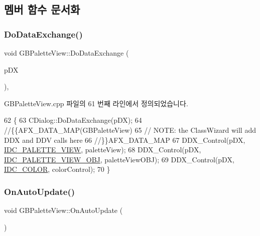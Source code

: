 \subsection{멤버 함수 문서화}
\mbox{\label{class_g_b_palette_view_a44dd90ae3c09c4fb0b2788a4c0577634}} 
\subsubsection{\texorpdfstring{Do\+Data\+Exchange()}{DoDataExchange()}}
{\footnotesize\ttfamily void G\+B\+Palette\+View\+::\+Do\+Data\+Exchange (\begin{DoxyParamCaption}\item[{C\+Data\+Exchange $\ast$}]{p\+DX }\end{DoxyParamCaption})\hspace{0.3cm}{\ttfamily [protected]}, {\ttfamily [virtual]}}



G\+B\+Palette\+View.\+cpp 파일의 61 번째 라인에서 정의되었습니다.


\begin{DoxyCode}
62 \{
63   CDialog::DoDataExchange(pDX);
64   \textcolor{comment}{//\{\{AFX\_DATA\_MAP(GBPaletteView)}
65   \textcolor{comment}{// NOTE: the ClassWizard will add DDX and DDV calls here}
66   \textcolor{comment}{//\}\}AFX\_DATA\_MAP}
67   DDX\_Control(pDX, \mbox{\hyperlink{resource_8h_a83b3979e02a9d3d4bcdc682ce19c1007}{IDC\_PALETTE\_VIEW}}, paletteView);
68   DDX\_Control(pDX, \mbox{\hyperlink{resource_8h_aa5e92cc3af1dc7e3cd943299585772a6}{IDC\_PALETTE\_VIEW\_OBJ}}, paletteViewOBJ);
69   DDX\_Control(pDX, \mbox{\hyperlink{resource_8h_a611975b03b6d7ce68b2de260b97086d0}{IDC\_COLOR}}, colorControl);
70 \}
\end{DoxyCode}
\mbox{\label{class_g_b_palette_view_a8d2c0e66a90accbbe35b286a51857728}} 
\subsubsection{\texorpdfstring{On\+Auto\+Update()}{OnAutoUpdate()}}
{\footnotesize\ttfamily void G\+B\+Palette\+View\+::\+On\+Auto\+Update (\begin{DoxyParamCaption}{ }\end{DoxyParamCaption})\hspace{0.3cm}{\ttfamily [protected]}}



